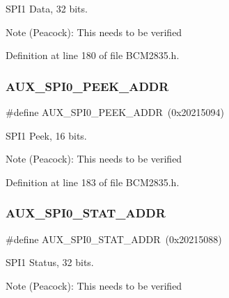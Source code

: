 S\+P\+I1 Data, 32 bits. 

\begin{DoxyNote}{Note}
(Peacock)\+: This needs to be verified 
\end{DoxyNote}


Definition at line 180 of file B\+C\+M2835.\+h.

\mbox{\label{group__SPI_gaaee919a849467dd94432c2852c391374}} 
\subsubsection{\texorpdfstring{A\+U\+X\+\_\+\+S\+P\+I0\+\_\+\+P\+E\+E\+K\+\_\+\+A\+D\+DR}{AUX\_SPI0\_PEEK\_ADDR}}
{\footnotesize\ttfamily \#define A\+U\+X\+\_\+\+S\+P\+I0\+\_\+\+P\+E\+E\+K\+\_\+\+A\+D\+DR~(0x20215094)}



S\+P\+I1 Peek, 16 bits. 

\begin{DoxyNote}{Note}
(Peacock)\+: This needs to be verified 
\end{DoxyNote}


Definition at line 183 of file B\+C\+M2835.\+h.

\mbox{\label{group__SPI_ga7630890159506d96bfeb196837c2efba}} 
\subsubsection{\texorpdfstring{A\+U\+X\+\_\+\+S\+P\+I0\+\_\+\+S\+T\+A\+T\+\_\+\+A\+D\+DR}{AUX\_SPI0\_STAT\_ADDR}}
{\footnotesize\ttfamily \#define A\+U\+X\+\_\+\+S\+P\+I0\+\_\+\+S\+T\+A\+T\+\_\+\+A\+D\+DR~(0x20215088)}



S\+P\+I1 Status, 32 bits. 

\begin{DoxyNote}{Note}
(Peacock)\+: This needs to be verified 
\end{DoxyNote}



